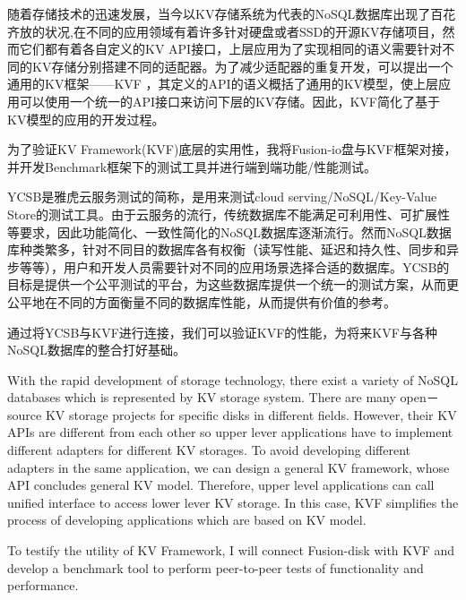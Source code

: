 
\begin{cabstract}
	随着存储技术的迅速发展，当今以KV存储系统为代表的NoSQL数据库出现了百花齐放的状况,在不同的应用领域有着许多针对硬盘或者SSD的开源KV存储项目，然而它们都有着各自定义的KV API接口，上层应用为了实现相同的语义需要针对不同的KV存储分别搭建不同的适配器。为了减少适配器的重复开发，可以提出一个通用的KV框架——KVF ，其定义的API的语义概括了通用的KV模型，使上层应用可以使用一个统一的API接口来访问下层的KV存储。因此，KVF简化了基于KV模型的应用的开发过程。

	为了验证KV Framework(KVF)底层的实用性，我将Fusion-io盘与KVF框架对接，并开发Benchmark框架下的测试工具并进行端到端功能/性能测试。

	YCSB是雅虎云服务测试的简称，是用来测试cloud serving/NoSQL/Key-Value Store的测试工具。由于云服务的流行，传统数据库不能满足可利用性、可扩展性等要求，因此功能简化、一致性简化的NoSQL数据库逐渐流行。然而NoSQL数据库种类繁多，针对不同目的数据库各有权衡（读写性能、延迟和持久性、同步和异步等等），用户和开发人员需要针对不同的应用场景选择合适的数据库。YCSB的目标是提供一个公平测试的平台，为这些数据库提供一个统一的测试方案，从而更公平地在不同的方面衡量不同的数据库性能，从而提供有价值的参考。

	通过将YCSB与KVF进行连接，我们可以验证KVF的性能，为将来KVF与各种NoSQL数据库的整合打好基础。

\end{cabstract}

\begin{eabstract}
	With the rapid development of storage technology, there exist a variety of NoSQL databases which is represented by KV storage system. There are many open－source KV storage projects for specific disks in different fields. However, their KV APIs are different from each other so upper lever applications have to implement different adapters for different KV storages. To avoid developing different adapters in the same application, we can design a general KV framework, whose API concludes general KV model. Therefore, upper level applications can call unified interface to access lower lever KV storage. In this case, KVF simplifies the process of developing applications which are based on KV model.
	
	To testify the utility of KV Framework, I will connect Fusion-disk with KVF and develop a benchmark tool to perform peer-to-peer tests of functionality and performance.
\end{eabstract}

